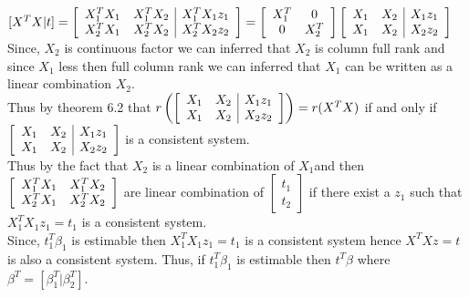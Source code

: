 \documentclass[12 pt, a4paper]{article}
\begin{document}
$[X^TX|t]= \left[
\begin{array}{c c |c}
X_1^TX_1 & X_1^TX_2 &X_1^TX_1z_1 \\
X_2^TX_1 &X_2^TX_2 &X_2^TX_2z_2 \\ 
\end{array}
\right]=
\left[
\begin{array}{c c}
X_1^T & 0\\
0 &X_2^T\\ 
\end{array}
\right]
 \left[
\begin{array}{c c |c}
X_1& X_2&X_1z_1\\
X_1 &X_2&X_2z_2 \\ 
\end{array}
\right]$\\

\noindent Since, $X_2$ is continuous factor we can inferred that $X_2$ is column full rank and since $X_1$ less then full column rank we can inferred that $X_1$ can be written as a linear combination $X_2$. \\

\noindent Thus by theorem 6.2 that 
$r\left(\left[
\begin{array}{c c |c}
X_1& X_2&X_1z_1\\
X_1 &X_2&X_2z_2 \\ 
\end{array}
\right]\right)=r(X^TX)$ if and only if
$\left[
\begin{array}{c c |c}
X_1& X_2&X_1z_1\\
X_1 &X_2&X_2z_2 \\ 
\end{array}
\right]$ is a consistent system.\\

\noindent Thus by the fact that $X_2$ is a linear combination of $X_1$and then $\left[
\begin{array}{c c}
X_1^TX_1 & X_1^TX_2\\
X_2^TX_1 &X_2^TX_2\\ 
\end{array}
\right]$ are linear combination of $\left[
\begin{array}{c}
t_1 \\
\hline
t_2
\end{array}
\right] $ if there exist a $z_1$ such that $X_1^TX_1z_1=t_1$ is a consistent system. \\

\noindent Since, $t_1^T\beta_1$ is estimable then $X_1^TX_1z_1=t_1$ is a consistent system hence $X^TXz=t$ is also a consistent system. Thus, if $t_1^T\beta_1$ is estimable then $t^T\beta$ where $\beta^T=[\beta_1^T|\beta_2^T]$. 
 
\end{document}
